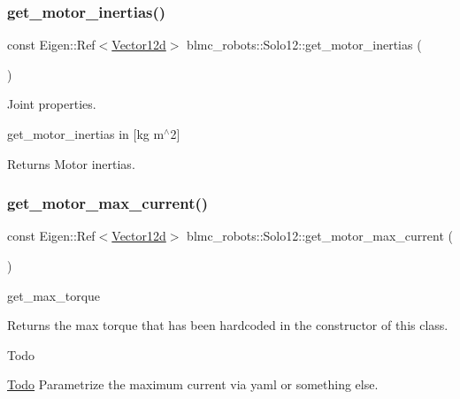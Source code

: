 \subsubsection{\texorpdfstring{get\+\_\+motor\+\_\+inertias()}{get\_motor\_inertias()}}
{\footnotesize\ttfamily const Eigen\+::\+Ref$<$\hyperlink{common__header_8hpp_a80313eb420184518596e745eecf4b494}{Vector12d}$>$ blmc\+\_\+robots\+::\+Solo12\+::get\+\_\+motor\+\_\+inertias (\begin{DoxyParamCaption}{ }\end{DoxyParamCaption})\hspace{0.3cm}{\ttfamily [inline]}}



Joint properties. 

get\+\_\+motor\+\_\+inertias in \mbox{[}kg m$^\wedge$2\mbox{]} \begin{DoxyReturn}{Returns}
Motor inertias. 
\end{DoxyReturn}
\mbox{\label{classblmc__robots_1_1Solo12_aa1994a07d52a00275e0c85f0ad38fb12}} 
\subsubsection{\texorpdfstring{get\+\_\+motor\+\_\+max\+\_\+current()}{get\_motor\_max\_current()}}
{\footnotesize\ttfamily const Eigen\+::\+Ref$<$\hyperlink{common__header_8hpp_a80313eb420184518596e745eecf4b494}{Vector12d}$>$ blmc\+\_\+robots\+::\+Solo12\+::get\+\_\+motor\+\_\+max\+\_\+current (\begin{DoxyParamCaption}{ }\end{DoxyParamCaption})\hspace{0.3cm}{\ttfamily [inline]}}



get\+\_\+max\+\_\+torque 

\begin{DoxyReturn}{Returns}
the max torque that has been hardcoded in the constructor of this class.
\end{DoxyReturn}
\begin{DoxyRefDesc}{Todo}
\item[\hyperlink{todo__todo000001}{Todo}]Parametrize the maximum current via yaml or something else. \end{DoxyRefDesc}
\mbox{\label{classblmc__robots_1_1Solo12_a37584471402cef8cf854d69bdbac98eb}} 
